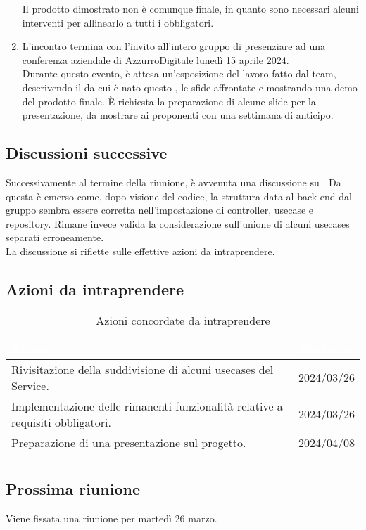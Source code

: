\begin{enumerate}
    Il prodotto dimostrato non è comunque finale, in quanto sono necessari alcuni interventi per allinearlo a tutti i  obbligatori.
    \item L'incontro termina con l'invito all'intero gruppo di presenziare ad una conferenza aziendale di AzzurroDigitale lunedì 15 aprile 2024.\\
    Durante questo evento, è attesa un'esposizione del lavoro fatto dal team, descrivendo il  da cui è nato questo , le sfide affrontate e mostrando una demo del prodotto finale. È richiesta la preparazione di alcune slide per la presentazione, da mostrare ai proponenti con una settimana di anticipo.
\end{enumerate}

\subsection{Discussioni successive}
Successivamente al termine della riunione, è avvenuta una discussione su . Da questa è emerso come, dopo visione del codice, la struttura data al back-end dal gruppo sembra essere corretta nell'impostazione di controller, usecase e repository. Rimane invece valida la considerazione sull'unione di alcuni usecases separati erroneamente.\\
La discussione si riflette sulle effettive azioni da intraprendere.

\subsection{Azioni da intraprendere} \label{subsec:action}

{
\setlength{\tabcolsep}{10pt}
\renewcommand{\arraystretch}{1.5}
\begin{xltabular}{\textwidth}{| X | c |}
    \hline
     \textbf{\textcolor{white}{Azione}} & \textbf{\textcolor{white}{Scadenza}} \\
    \hline
    \endhead
   Rivisitazione della suddivisione di alcuni usecases del Service. & 2024/03/26\\
    \hline
    Implementazione delle rimanenti funzionalità relative a requisiti obbligatori. & 2024/03/26\\
    \hline
    Preparazione di una presentazione sul progetto. & 2024/04/08\\
    \hline
     \caption{Azioni concordate da intraprendere}
    \label{tab:reqimp}
\end{xltabular}
}

\subsection{Prossima riunione} \label{subsec:riunione}
Viene fissata una riunione per martedì 26 marzo.
\newpage    
